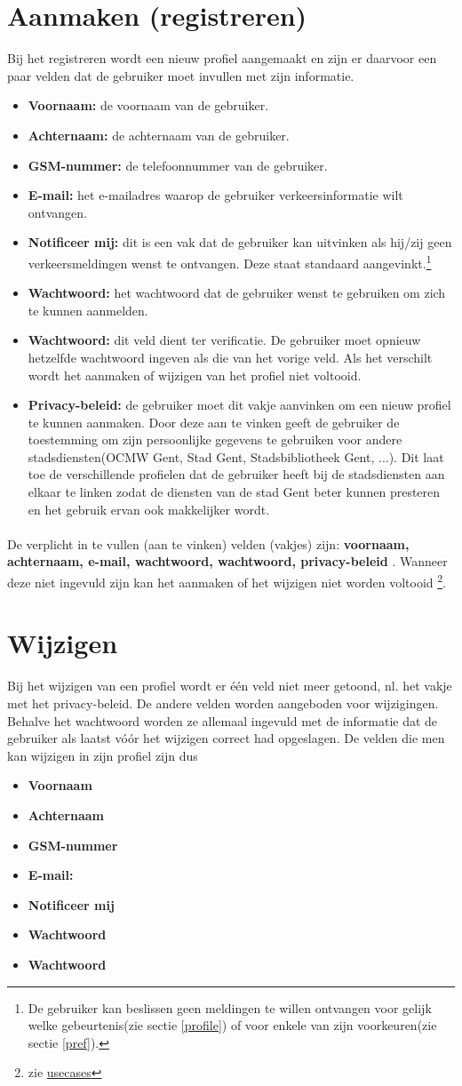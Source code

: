 \documentclass{scrbook}
\newcommand*{\veld}[1]{
	\item \textbf{#1} 
}
\newcommand*{\verplicht}[1]{
	\textbf{#1}
}
\begin{document}
\section{Aanmaken (registreren)}
Bij het registreren wordt een nieuw profiel aangemaakt en zijn er daarvoor een paar velden dat de gebruiker moet invullen met zijn informatie.
\begin{itemize}
\veld{Voornaam:} de voornaam van de gebruiker.
\veld{Achternaam:} de achternaam van de gebruiker.
\veld{GSM-nummer:} de telefoonnummer van de gebruiker.
\veld{E-mail:} het e-mailadres waarop de gebruiker verkeersinformatie wilt ontvangen.
\veld{Notificeer mij:} dit is een vak dat de gebruiker kan uitvinken als hij/zij geen verkeersmeldingen wenst te ontvangen. Deze staat standaard aangevinkt.\footnote{De gebruiker kan beslissen geen meldingen te willen ontvangen voor gelijk welke gebeurtenis(zie sectie \ref{profile}) of voor enkele van zijn voorkeuren(zie sectie \ref{pref}).\label{foot_meld}}
\veld{Wachtwoord:} het wachtwoord dat de gebruiker wenst te gebruiken om zich te kunnen aanmelden.
\veld{Wachtwoord:} dit veld dient ter verificatie. De gebruiker moet opnieuw hetzelfde wachtwoord ingeven als die van het vorige veld. Als het verschilt wordt het aanmaken of wijzigen van het profiel niet voltooid.
\veld{Privacy-beleid:} de gebruiker moet dit vakje aanvinken om een nieuw profiel te kunnen aanmaken. Door deze aan te vinken geeft de gebruiker de toestemming om zijn persoonlijke gegevens te gebruiken voor andere stadsdiensten(OCMW Gent, Stad Gent, Stadsbibliotheek Gent, ...). Dit laat toe de verschillende profielen dat de gebruiker heeft bij de stadsdiensten aan elkaar te linken zodat de diensten van de stad Gent beter kunnen presteren en het gebruik ervan ook makkelijker wordt.
\end{itemize}
 \paragraph{}De verplicht in te vullen (aan te vinken) velden (vakjes) zijn: \verplicht{voornaam, achternaam, e-mail, wachtwoord, wachtwoord, privacy-beleid}.
Wanneer deze niet ingevuld zijn kan het aanmaken of het wijzigen niet worden voltooid \footnote{zie \href{usecases.pdf}{usecases}}.

\section{Wijzigen}
Bij het wijzigen van een profiel wordt er \'e\'en veld niet meer getoond, nl. het vakje met het privacy-beleid. De andere velden worden aangeboden voor wijzigingen. Behalve het wachtwoord worden ze allemaal ingevuld met de informatie dat de gebruiker als laatst v\'o\'or het wijzigen correct had opgeslagen. De velden die men kan wijzigen in zijn profiel zijn dus
\begin{itemize}
\veld{Voornaam}
\veld{Achternaam}
\veld{GSM-nummer}
\veld{E-mail:}
\veld{Notificeer mij}
\veld{Wachtwoord}
\veld{Wachtwoord}
\end{itemize}
\end{document}
